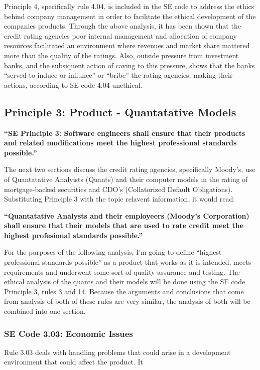 \documentclass[11pt]{article}
\begin{document}
\begin{multicols}{2}
Principle 4, specifically rule 4.04, is included in the SE code to address the ethics behind company management in order to facilitate the ethical development of the companies products.  Through the above analysis, it has been shown that the credit rating agencies poor internal management and allocation of company resources facilitated an environment where revenues and market share mattered more than the quality of the ratings.  Also, outside pressure from investment banks, and the subsiquent action of caving to this pressure, shows that the banks ``served to induce or influnce'' or ``bribe'' the rating agencies, making their actions, according to SE code 4.04 unethical.

 
\subsection{Principle 3: Product - Quantatative Models}


\textbf{``SE Principle 3: Software engineers shall ensure that their products and related modifications meet the highest professional standards possible.''}


The next two sections discuss the credit rating agencies, specifically Moody's, use of Quantatative Analyists (Quants) and their computer models in the rating of mortgage-backed securities and CDO's (Collatorized Default Obligations).  Substituting Principle 3 with the topic relavent information, it would read:


\textbf{``Quantatative Analysts and their employeers (Moody's Corporation) shall ensure that their models that are used to rate credit meet the highest profesional standards possible.''} 


For the purposes of the following analysis, I'm going to define ``highest professional standards possible'' as a product that works as it is intended, meets requirements and underwent some sort of quality assurance and testing.  The ethical analysis of the quants and their models will be done using the SE code Principle 3, rules 3 and 14.  Because the arguments and conclusions that come from analysis of both of these rules are very similar, the analysis of both will be combined into one section.


\subsubsection{SE Code 3.03: Economic Issues}


Rule 3.03 deals with handling problems that could arise in a development environment that could affect the product.  It



\end{multicols}
\end{document}
